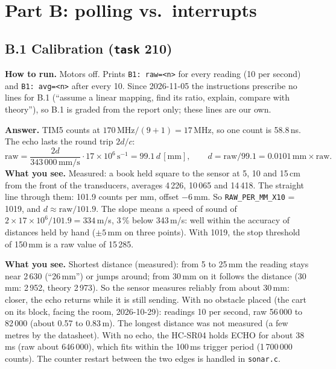 \documentclass[11pt,a4paper]{article}
\newcommand{\lv}[1]{\texttt{#1}}                 %
\newcommand{\run}[1]{\textbf{How to run.} #1}
\newcommand{\see}[1]{\textbf{What you see.} #1}
\begin{document}
\section{Part B: polling vs.\ interrupts}

\subsection*{B.1 Calibration (\lv{task} 210)}
\run{Motors off. Prints \texttt{B1: raw=<n>} for every reading (10 per second) and \texttt{B1: avg=<n>} after every
10. Since 2026-11-05 the instructions prescribe no lines for B.1 (``assume a linear mapping, find its ratio, explain,
compare with theory''), so B.1 is graded from the report only; these lines are our own.}

\textbf{Answer.} TIM5 counts at $170\,\mathrm{MHz}/(9+1) = 17$\,MHz, so one count is 58.8\,ns. The echo lasts the
round trip $2d/c$:
\[
  \text{raw} = \frac{2d}{343\,000\,\mathrm{mm/s}} \cdot 17 \times 10^{6}\,\mathrm{s^{-1}} = 99.1\,d\,[\mathrm{mm}],
  \qquad d = \text{raw}/99.1 = 0.0101\,\text{mm} \times \text{raw}.
\]
\see{Measured: a book held square to the sensor at 5, 10 and 15\,cm from the front of the transducers, averages
4\,226, 10\,065 and 14\,418. The straight line through them: 101.9 counts per mm, offset $-6$\,mm. So
\texttt{RAW\_PER\_MM\_X10} = 1019, and $d \approx \text{raw}/101.9$. The slope means a speed of sound of
$2 \times 17 \times 10^{6} / 101.9 = 334$\,m/s, 3\,\% below 343\,m/s: well within the accuracy of distances held by
hand ($\pm 5$\,mm on three points). With 1019, the stop threshold of 150\,mm is a raw value of 15\,285.}

\see{Shortest distance (measured): from 5 to 25\,mm the reading stays near 2\,630 (``26\,mm'') or jumps around; from
30\,mm on it follows the distance (30\,mm: 2\,952, theory 2\,973). So the sensor measures reliably from about 30\,mm:
closer, the echo returns while it is still sending. With no obstacle placed (the cart on its block, facing the room,
2026-10-29): readings 10 per second, raw 56\,000 to 82\,000 (about 0.57 to 0.83\,m). The longest distance was not
measured (a few metres by the datasheet). With no echo, the HC-SR04 holds ECHO for about 38\,ms (raw about
646\,000), which fits within the 100\,ms trigger period (1\,700\,000 counts). The counter restart between the two
edges is handled in \texttt{sonar.c}.}
\end{document}
